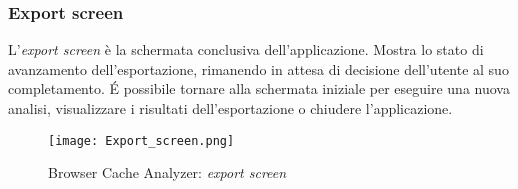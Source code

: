 \subsubsection{Export screen}
L'\textit{export screen} è la schermata conclusiva dell'applicazione. Mostra lo stato di avanzamento dell'esportazione, rimanendo in attesa di decisione dell'utente al suo completamento. \'E possibile tornare alla schermata iniziale per eseguire una nuova analisi, visualizzare i risultati dell'esportazione o chiudere l'applicazione.  

\begin{figure}[htpb]
	\begin{center}
		\texttt{[image: Export\_screen.png]}
	\end{center}
	\caption[Browser Cache Analyzer: \textit{export screen}]{Browser Cache Analyzer: \textit{export screen}}
\end{figure}


